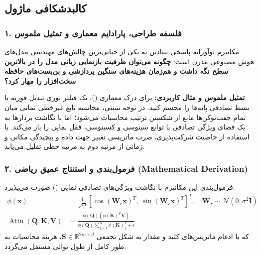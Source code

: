 \subsection{کالبدشکافی ماژول }

\subsubsection*{۱. فلسفه طراحی، پارادایم معماری و تمثیل ملموس}
مکانیزم نوآورانه  پاسخی بنیادین به یکی از حیاتی‌ترین چالش‌های مهندسی مدل‌های هوش مصنوعی مدرن است: \textbf{چگونه می‌توان ظرفیت بازنمایی زبانی مدل را در بالاترین سطح نگه داشت و هم‌زمان هزینه‌های سنگین پردازشی و بن‌بست‌های حافظه سخت‌افزار را مهار کرد؟}

\textbf{تمثیل ملموس و مثال کاربردی:}
برای درک معماری  ()، یک فیلتر نوری تبدیل فوریه با بسط تصادفی پایه‌ها را مجسم کنید. در توجه سنتی، محاسبه تابع غیرخطی نمایی میان تمام جفت‌توکن‌ها مانع از شکستن ترتیب محاسبات می‌شود؛ اما  با نگاشت بردارها به یک فضای ویژگی تصادفی با توابع سینوسی و کسینوسی، قفل نمایی را باز می‌کند. با استفاده از خاصیت شرکت‌پذیری، ضرب ماتریسی تغییر جهت داده و پیچیدگی مکانی و زمانی از مرتبه دوم به مرتبه خطی تقلیل می‌یابد.

\subsubsection*{۲. فرمول‌بندی و استنتاج عمیق ریاضی (Mathematical Derivation)}
فرمول‌بندی این مکانیزم با نگاشت ویژگی‌های تصادفی نمایی () صورت می‌پذیرد:
\begin{align}
\phi(\mathbf{x}) &= \frac{1}{\sqrt{m}} \left[ \cos(\mathbf{W}_r \mathbf{x})^T, \; \sin(\mathbf{W}_r \mathbf{x})^T \right]^T, \quad \mathbf{W}_r \sim \mathcal{N}(0, \sigma^2 \mathbf{I}) \\
\operatorname{Attn}(\mathbf{Q}, \mathbf{K}, \mathbf{V}) &= \frac{\phi(\mathbf{Q}) \left(\phi(\mathbf{K})^T \mathbf{V}\right)}{\phi(\mathbf{Q}) \sum_{j=1}^N \phi(\mathbf{K})_j^T + \epsilon}
\end{align}
که با ادغام ماتریس‌های کلید و مقدار به شکل تجمعی $\mathbf{S} \in \mathbb{R}^{2m \times d}$، هزینه محاسبات به طور کامل از طول توالی مستقل می‌گردد.

